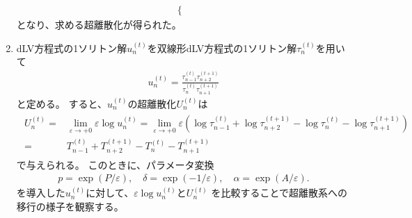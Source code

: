 \documentclass{jsarticle}
\begin{document}
\begin{enumerate}
\begin{align}
\begin{cases}
\end{cases}
\end{align}
となり、求める超離散化が得られた。
\item 
dLV方程式の1ソリトン解$u_{n}^{(t)}$を双線形dLV方程式の1ソリトン解$\tau_{n}^{(t)}$を用いて
\begin{align}
u_{n}^{(t)}=\frac{\tau_{n-1}^{(t)}\tau_{n+2}^{(t+1)}}{\tau_{n}^{(t)}\tau_{n+1}^{(t+1)}}
\end{align}
と定める。
すると、$u_{n}^{(t)}$の超離散化$U_{n}^{(t)}$は
\begin{align}
\begin{split}
U_{n}^{(t)}=&\lim_{\varepsilon\to+0}\varepsilon\log u_{n}^{(t)}
=\lim_{\varepsilon\to+0}\varepsilon\left(\log\tau_{n-1}^{(t)}+\log\tau_{n+2}^{(t+1)}-\log\tau_{n}^{(t)}-\log\tau_{n+1}^{(t+1)}\right)\\
=&T_{n-1}^{(t)}+T_{n+2}^{(t+1)}-T_{n}^{(t)}-T_{n+1}^{(t+1)}
\end{split}
\end{align}
で与えられる。
このときに、パラメータ変換
\begin{align}
p=\exp\left(P/\varepsilon\right),\quad
\delta=\exp\left(-1/\varepsilon\right),\quad
\alpha=\exp\left(A/\varepsilon\right).
\end{align}
を導入した$u_{n}^{(t)}$に対して、$\varepsilon\log u_{n}^{(t)}$と$U_{n}^{(t)}$
を比較することで超離散系への移行の様子を観察する。
\end{enumerate}
\end{document}
